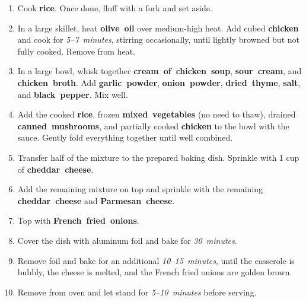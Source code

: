\documentclass[11pt,letterpaper]{article}
\begin{document}
\begin{enumerate}
    \item Cook \textbf{rice}. Once done, fluff with a fork and set aside.

    \item In a large skillet, heat \textbf{olive~oil} over medium-high heat. Add cubed \textbf{chicken} and cook for \textit{5--7~minutes}, stirring occasionally, until lightly browned but not fully cooked. Remove from heat.

    \item In a large bowl, whisk together \textbf{cream~of~chicken~soup}, \textbf{sour~cream}, and \textbf{chicken~broth}. Add \textbf{garlic~powder}, \textbf{onion~powder}, \textbf{dried~thyme}, \textbf{salt}, and \textbf{black~pepper}. Mix well.

    \item Add the cooked \textbf{rice}, frozen \textbf{mixed~vegetables} (no need to thaw), drained \textbf{canned~mushrooms}, and partially cooked \textbf{chicken} to the bowl with the sauce. Gently fold everything together until well combined.

    \item Transfer half of the mixture to the prepared baking dish. Sprinkle with 1 cup of \textbf{cheddar~cheese}.

    \item Add the remaining mixture on top and sprinkle with the remaining \textbf{cheddar~cheese} and \textbf{Parmesan~cheese}.

    \item Top with \textbf{French~fried~onions}.

    \item Cover the dish with aluminum foil and bake for \textit{30~minutes}.

    \item Remove foil and bake for an additional \textit{10--15~minutes}, until the casserole is bubbly, the cheese is melted, and the French fried onions are golden brown.

    \item Remove from oven and let stand for \textit{5--10~minutes} before serving.
\end{enumerate}
\end{document}
